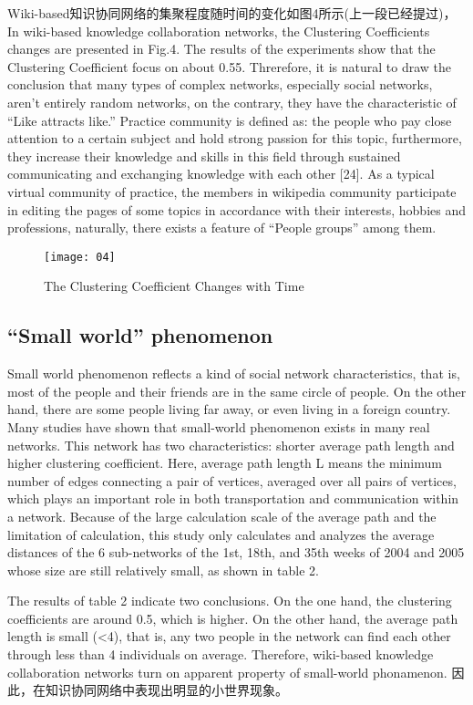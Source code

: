 \documentclass{elsarticle}
\begin{document}
Wiki-based知识协同网络的集聚程度随时间的变化如图4所示(上一段已经提过)，In wiki-based knowledge collaboration networks, the Clustering Coefficients changes are presented in Fig.4. The results of the experiments show that the Clustering Coefficient focus on about 0.55. Threrefore, it is natural to draw the conclusion that many types of complex networks, especially social networks, aren’t entirely random networks, on the contrary, they have the characteristic of “Like attracts like.” Practice community is defined as: the people who pay close attention to a certain subject and hold strong passion for this topic, furthermore, they increase their knowledge and skills in this field through sustained communicating and exchanging knowledge with each other [24]. As a typical virtual community of practice, the members in wikipedia community participate in editing the pages of some topics in accordance with their interests, hobbies and professions, naturally, there exists a feature of “People groups” among them.
\begin{figure}[htpb]
  \centering
  \texttt{[image: 04]}
  \caption{ The Clustering Coefficient Changes with Time}
\end{figure}

\subsection{“Small world” phenomenon }
\label{sec:small-world-phen}

Small world phenomenon reflects a kind of social network characteristics, that is, most of the people and their friends are in the same circle of people. On the other hand, there are some people living far away, or even living in a foreign country. Many studies have shown that small-world phenomenon exists in many real networks. This network has two characteristics: shorter average path length and higher clustering coefficient. Here, average path length L means the minimum number of edges connecting a pair of vertices, averaged over all pairs of vertices, which plays an important role in both transportation and communication within a network. Because of the large calculation scale of the average path and the limitation of calculation, this study only calculates and analyzes the average distances of the 6 sub-networks of the 1st, 18th, and 35th weeks of 2004 and 2005 whose size are still relatively small, as shown in table 2.

The results of table 2 indicate two conclusions. On the one hand, the clustering coefficients are around 0.5, which is higher. On the other hand, the average path length is small (<4), that is, any two people in the network can find each other through less than 4 individuals on average. Therefore, wiki-based knowledge collaboration networks turn on apparent property of small-world phonamenon. 因此，在知识协同网络中表现出明显的小世界现象。
\end{document}
